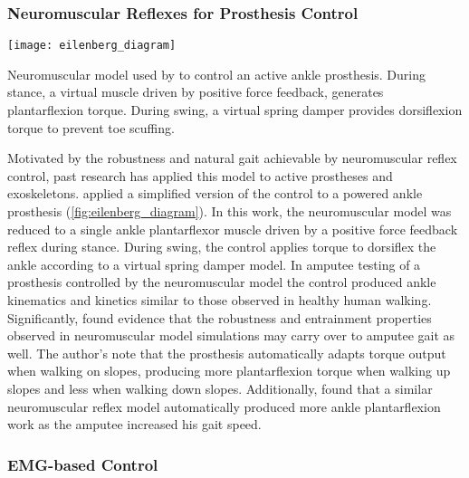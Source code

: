 \subsubsection{Neuromuscular Reflexes for Prosthesis Control}
\begin{marginfigure}
    \centering
    \texttt{[image: eilenberg\_diagram]} \caption{Neuromuscular
    model used by \citet{eilenberg2010control} to control an active ankle
    prosthesis. During stance, a virtual muscle driven by positive force
    feedback, generates plantarflexion torque. During swing, a virtual spring
    damper provides dorsiflexion torque to prevent toe scuffing.}
    \label{fig:eilenberg_diagram}
\end{marginfigure}
Motivated by the robustness and natural gait achievable by neuromuscular
reflex control, past research has applied this model to active prostheses and
exoskeletons. \citet{eilenberg2010control} applied a simplified version of the
control to a powered ankle prosthesis (\cref{fig:eilenberg_diagram}). In this
work, the neuromuscular model was reduced to a single ankle plantarflexor muscle
driven by a positive force feedback reflex during stance. During swing, the
control applies torque to dorsiflex the ankle according to a virtual spring
damper model. In amputee testing of a prosthesis controlled by the neuromuscular
model the control produced ankle kinematics and kinetics similar to those
observed in healthy human walking. Significantly,
\citeauthor{eilenberg2010control} found evidence that the robustness and
entrainment properties observed in neuromuscular model simulations may carry
over to amputee gait as well. The author's note that the prosthesis
automatically adapts torque output when walking on slopes, producing more
plantarflexion torque when walking up slopes and less when walking down slopes.
Additionally, \citet{markowitz2011speed} found that a similar neuromuscular
reflex model automatically produced more ankle plantarflexion work as the
amputee increased his gait speed.

\subsubsection{EMG-based Control}\label{sec:emg_control}


